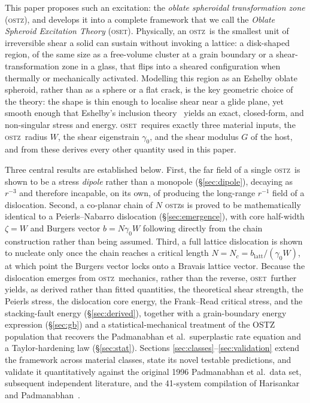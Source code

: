 \documentclass[5p,sort&compress]{elsarticle}
\newcommand{\OSTZ}{\textsc{ostz}}
\newcommand{\OSET}{\textsc{oset}}
\newcommand{\gz}{\gamma_0}
\begin{document}
This paper proposes such an excitation: the \emph{oblate spheroidal
transformation zone} (\OSTZ), and develops it into a complete
framework that we call the \emph{Oblate Spheroid Excitation Theory}
(\OSET). Physically, an \OSTZ\ is the smallest unit of irreversible
shear a solid can sustain without invoking a lattice: a disk-shaped
region, of the same size as a free-volume cluster at a grain boundary
or a shear-transformation zone in a glass, that flips into a sheared
configuration when thermally or mechanically activated. Modelling
this region as an Eshelby oblate spheroid, rather than as a sphere or
a flat crack, is the key geometric choice of the theory: the shape is
thin enough to localise shear near a glide plane, yet smooth enough
that Eshelby's inclusion theory~\cite{eshelby1957,mura1987} yields an
exact, closed-form, and non-singular stress and energy. \OSET\
requires exactly three material inputs, the \OSTZ\ radius $W$, the
shear eigenstrain $\gz$, and the shear modulus $G$ of the host, and
from these derives every other quantity used in this paper.

Three central results are established below. First, the far field of
a single \OSTZ\ is shown to be a stress \emph{dipole} rather than a
monopole (\S\ref{sec:dipole}), decaying as $r^{-3}$ and therefore
incapable, on its own, of producing the long-range $r^{-1}$ field of a
dislocation. Second, a co-planar chain of $N$ \OSTZ s is proved to be
mathematically identical to a Peierls--Nabarro dislocation
(\S\ref{sec:emergence}), with core half-width $\zeta=W$ and Burgers
vector $b=N\gz W$ following directly from the chain construction
rather than being assumed. Third, a full lattice dislocation is shown
to nucleate only once the chain reaches a critical length
$N=N_c=b_\mathrm{latt}/(\gz W)$, at which point the Burgers vector
locks onto a Bravais lattice vector. Because the dislocation emerges
from \OSTZ\ mechanics, rather than the reverse, \OSET\ further yields,
as derived rather than fitted quantities, the theoretical shear
strength, the Peierls stress, the dislocation core energy, the
Frank--Read critical stress, and the stacking-fault energy
(\S\ref{sec:derived}), together with a grain-boundary energy
expression (\S\ref{sec:gb}) and a statistical-mechanical treatment of
the OSTZ population that recovers the Padmanabhan et al.\ superplastic
rate equation and a Taylor-hardening law (\S\ref{sec:stat}). Sections
\ref{sec:classes}--\ref{sec:validation} extend the framework across
material classes, state its novel testable predictions, and validate
it quantitatively against the original 1996 Padmanabhan et al.\ data
set, subsequent independent literature, and the 41-system compilation
of Harisankar and Padmanabhan~\cite{harisankar2025}.
\end{document}
